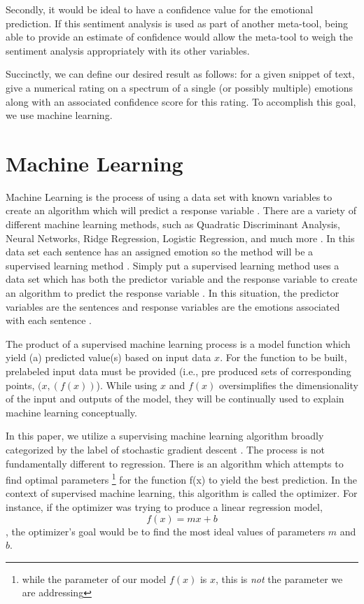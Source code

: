 \documentclass[titlepage,letterpaper]{article}
\begin{document}
Secondly, it would be ideal to have a confidence value for the emotional prediction. If this sentiment analysis is used as part of another meta-tool, being able to provide an estimate of confidence would allow the meta-tool to weigh the sentiment analysis appropriately with its other variables.

Succinctly, we can define our desired result as follows: for a given snippet of text, give a numerical rating on a spectrum of a single (or possibly multiple) emotions along with an associated confidence score for this rating. To accomplish this goal, we use machine learning. 

\section{Machine Learning}

Machine Learning is the process of using a data set with known variables to create an algorithm which will predict a response variable \cite{Statlearning}. There are a variety of different machine learning methods, such as Quadratic Discriminant Analysis, Neural Networks, Ridge Regression, Logistic Regression, and much more \cite{Statlearning}. In this data set each sentence has an assigned emotion so the method will be a supervised learning method \cite{Statlearning}. Simply put a supervised learning method uses a data set which has both the predictor variable and the response variable to create an algorithm to predict the response variable \cite{Statlearning}. In this situation, the predictor variables are the sentences and response variables are the emotions associated with each sentence \cite{Statlearning}. 

    The product of a supervised machine learning process is a model function which yield (a) predicted value(s) based on input data $x$. For the function to be built, prelabeled input data must be provided (i.e., pre produced sets of corresponding points, $(x,(f(x))$). While using $x$ and $f(x)$ oversimplifies the dimensionality of the input and outputs of the model, they will be continually used to explain machine learning conceptually.

In this paper, we utilize a supervising machine learning algorithm broadly categorized by the label of stochastic gradient descent \cite{stoch}. The process is not fundamentally different to regression.  There is an algorithm which attempts to find optimal parameters \cite{regression} \footnote{while the parameter of our model $f(x)$ is $x$, this is \emph{not} the parameter we are addressing} for the function f(x) to yield the best prediction. In the context of supervised machine learning, this algorithm is called the optimizer. For instance, if the optimizer was trying to produce a linear regression model, 
\[f(x) = mx + b \], the optimizer’s goal would be to find the most ideal values of parameters $m$ and $b$. 
\end{document}
